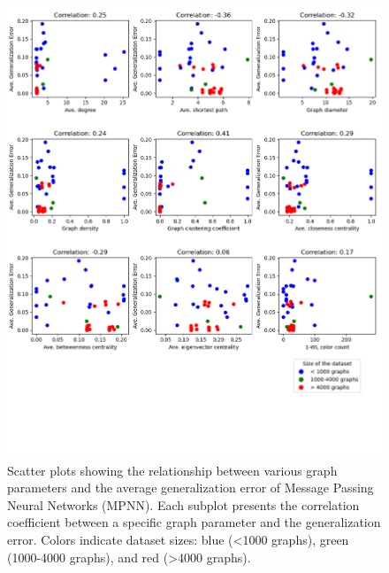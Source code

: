 \begin{figure}[H]
    \centering
    \includegraphics[width=\textwidth]{images/correlation_MPNN.png}
    \caption{Scatter plots showing the relationship between various graph parameters and the average generalization error of Message Passing Neural Networks (MPNN). Each subplot presents the correlation coefficient between a specific graph parameter and the generalization error. Colors indicate dataset sizes: blue (<1000 graphs), green (1000-4000 graphs), and red (>4000 graphs).}
    \label{fig:correlation_MPNN}
\end{figure}

